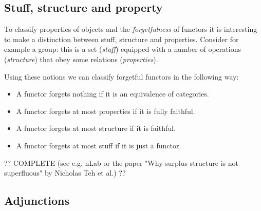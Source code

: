 

\subsection{Stuff, structure and property}

    To classify properties of objects and the \textit{forgetfulness} of functors it is interesting to make a distinction between stuff, structure and properties. Consider for example a group: this is a set (\textit{stuff}) equipped with a number of operations (\textit{structure}) that obey some relations (\textit{properties}).

    Using these notions we can classify forgetful functors in the following way:
    \begin{itemize}
        \item A functor forgets nothing if it is an equivalence of categories.
        \item A functor forgets at most properties if it is fully faithful.
        \item A functor forgets at most structure if it is faithful.
        \item A functor forgets at most stuff if it is just a functor.
    \end{itemize}

    ?? COMPLETE (see e.g. nLab or the paper "Why surplus structure is not superfluous" by Nicholas Teh et al.) ??

\subsection{Adjunctions}\label{section:adjunction}

